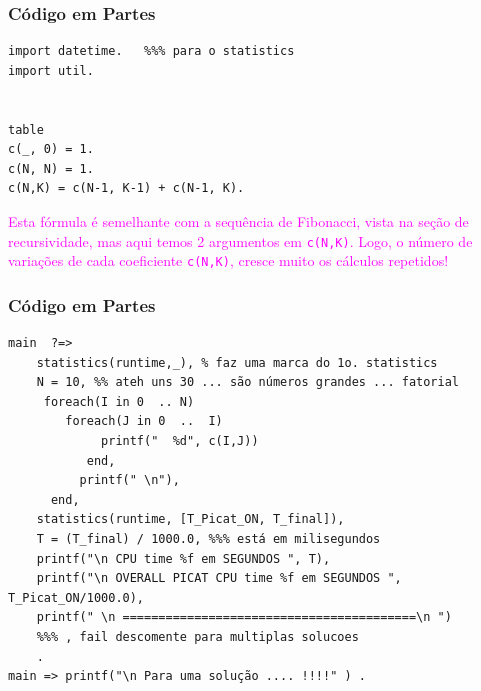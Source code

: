 \begin{frame}[fragile] 

\frametitle{Código em Partes}

\begin{footnotesize}
\begin{verbatim}
import datetime.   %%% para o statistics
import util.


table
c(_, 0) = 1.
c(N, N) = 1.
c(N,K) = c(N-1, K-1) + c(N-1, K).
\end{verbatim}
\end{footnotesize}    

\begin{center}
\textcolor{magenta}{Esta fórmula é semelhante com a sequência de Fibonacci, vista
na seção de recursividade, mas aqui temos 2 argumentos em \texttt{c(N,K)}. 
Logo, o número de 
variações de cada coeficiente \texttt{c(N,K)}, 
cresce muito os cálculos repetidos!}
\end{center}

\end{frame}



\begin{frame}[fragile] 
\frametitle{Código em Partes}

\begin{footnotesize}
\begin{verbatim}
main  ?=>  
    statistics(runtime,_), % faz uma marca do 1o. statistics
    N = 10, %% ateh uns 30 ... são números grandes ... fatorial
     foreach(I in 0  .. N)
        foreach(J in 0  ..  I)
             printf("  %d", c(I,J))
           end,
          printf(" \n"),
      end, 
    statistics(runtime, [T_Picat_ON, T_final]),
    T = (T_final) / 1000.0, %%% está em milisegundos
    printf("\n CPU time %f em SEGUNDOS ", T),
    printf("\n OVERALL PICAT CPU time %f em SEGUNDOS ", T_Picat_ON/1000.0),
    printf(" \n =========================================\n ")
    %%% , fail descomente para multiplas solucoes
    .
main => printf("\n Para uma solução .... !!!!" ) .
\end{verbatim}
\end{footnotesize}
    
\end{frame}


